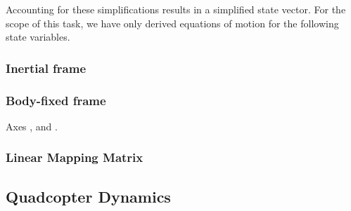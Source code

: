Accounting for these simplifications results in a simplified state vector. For the scope of this task, we have only derived equations of motion for the following state variables.
\subsubsection[Inertial frame]{Inertial frame } %
\subsubsection[Body-fixed frame]{Body-fixed frame }
Axes ,  and .
\subsubsection[Linear Mapping Matrix]{Linear Mapping Matrix }
\label{sss:lmapmatQ}

\subsection{Quadcopter Dynamics}
